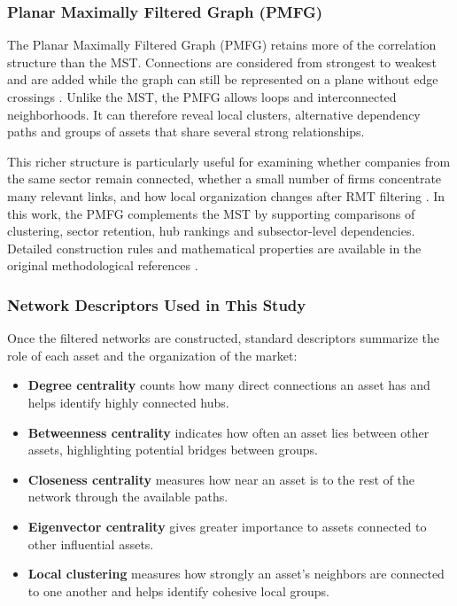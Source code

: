 \subsubsection{Planar Maximally Filtered Graph (PMFG)}
The Planar Maximally Filtered Graph (PMFG) retains more of the correlation structure than the MST. Connections are considered from strongest to weakest and are added while the graph can still be represented on a plane without edge crossings \cite{tumminello_2005_tool}. Unlike the MST, the PMFG allows loops and interconnected neighborhoods. It can therefore reveal local clusters, alternative dependency paths and groups of assets that share several strong relationships.

This richer structure is particularly useful for examining whether companies from the same sector remain connected, whether a small number of firms concentrate many relevant links, and how local organization changes after RMT filtering \cite{aste_2010_correlation,pozzi_2013_spread}. In this work, the PMFG complements the MST by supporting comparisons of clustering, sector retention, hub rankings and subsector-level dependencies. Detailed construction rules and mathematical properties are available in the original methodological references \cite{tumminello_2005_tool,tumminello_2010_correlation}.

\subsubsection{Network Descriptors Used in This Study}
Once the filtered networks are constructed, standard descriptors summarize the role of each asset and the organization of the market:
\begin{itemize}
  \item \textbf{Degree centrality} counts how many direct connections an asset has and helps identify highly connected hubs.
  \item \textbf{Betweenness centrality} indicates how often an asset lies between other assets, highlighting potential bridges between groups.
  \item \textbf{Closeness centrality} measures how near an asset is to the rest of the network through the available paths.
  \item \textbf{Eigenvector centrality} gives greater importance to assets connected to other influential assets.
  \item \textbf{Local clustering} measures how strongly an asset's neighbors are connected to one another and helps identify cohesive local groups.
\end{itemize}

